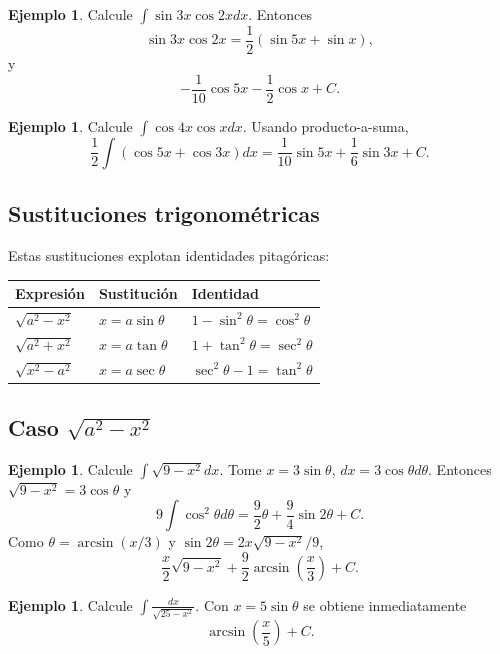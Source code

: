\documentclass[12pt]{article}
\theoremstyle{definition}
\newtheorem{ejemplo}[teorema]{Ejemplo}
\theoremstyle{remark}
\begin{document}
\begin{ejemplo}Calcule $\int\sin3x\cos2x dx$. Entonces
\[\sin3x\cos2x=\frac12(\sin5x+\sin x),\]
y
\[\boxed{-\frac1{10}\cos5x-\frac12\cos x+C}.\]\end{ejemplo}

\begin{ejemplo}Calcule $\int\cos4x\cos xdx$. Usando producto-a-suma,
\[\frac12\int(\cos5x+\cos3x)dx=\boxed{\frac1{10}\sin5x+\frac16\sin3x+C}.\]\end{ejemplo}
\subsection*{Sustituciones trigonométricas}

Estas sustituciones explotan identidades pitagóricas:
\begin{center}\begin{tabular}{lll}\toprule
Expresión & Sustitución & Identidad\\\midrule
$\sqrt{a^2-x^2}$ & $x=a\sin\theta$ & $1-\sin^2\theta=\cos^2\theta$\\
$\sqrt{a^2+x^2}$ & $x=a\tan\theta$ & $1+\tan^2\theta=\sec^2\theta$\\
$\sqrt{x^2-a^2}$ & $x=a\sec\theta$ & $\sec^2\theta-1=\tan^2\theta$\\\bottomrule
\end{tabular}\end{center}
\subsection*{Caso $\sqrt{a^2-x^2}$}
\begin{ejemplo}Calcule $\int\sqrt{9-x^2}dx$. Tome $x=3\sin\theta$, $dx=3\cos\theta d\theta$. Entonces $\sqrt{9-x^2}=3\cos\theta$ y
\[9\int\cos^2\theta d\theta=\frac92\theta+\frac94\sin2\theta+C.\]
Como $\theta=\arcsin(x/3)$ y $\sin2\theta=2x\sqrt{9-x^2}/9$,
\[\boxed{\frac{x}{2}\sqrt{9-x^2}+\frac92\arcsin\left(\frac{x}{3}\right)+C}.\]\end{ejemplo}

\begin{ejemplo}Calcule $\int\frac{dx}{\sqrt{25-x^2}}$. Con $x=5\sin\theta$ se obtiene inmediatamente
\[\boxed{\arcsin\left(\frac{x}{5}\right)+C}.\]\end{ejemplo}
\end{document}
